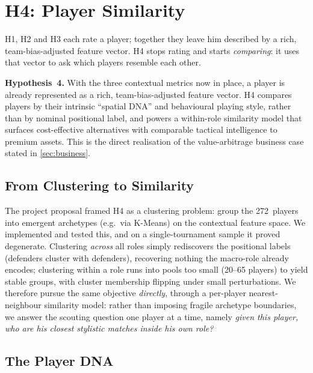 \documentclass[12pt,a4paper]{article}
\begin{document}
\clearpage
\section{H4: Player Similarity}\label{sec:h4}

H1, H2 and H3 each rate a player; together they leave him described by a rich, team-bias-adjusted feature vector. H4 stops rating and starts \emph{comparing}: it uses that vector to ask which players resemble each other.

\textbf{Hypothesis~4.}
With the three contextual metrics now in place, a player is already represented as a rich, team-bias-adjusted feature vector.
H4 compares players by their intrinsic ``spatial DNA'' and behavioural playing style, rather than by nominal positional label, and powers a within-role similarity model that surfaces cost-effective alternatives with comparable tactical intelligence to premium assets.
This is the direct realisation of the value-arbitrage business case stated in \cref{sec:business}.

\subsection{From Clustering to Similarity}\label{sec:h4-from-clustering}

The project proposal framed H4 as a clustering problem: group the 272~players into emergent archetypes (e.g.\ via K-Means) on the contextual feature space.
We implemented and tested this, and on a single-tournament sample it proved degenerate.
Clustering \emph{across} all roles simply rediscovers the positional labels (defenders cluster with defenders), recovering nothing the macro-role already encodes; clustering within a role runs into pools too small (20--65 players) to yield stable groups, with cluster membership flipping under small perturbations.
We therefore pursue the same objective \emph{directly}, through a per-player nearest-neighbour similarity model: rather than imposing fragile archetype boundaries, we answer the scouting question one player at a time, namely \emph{given this player, who are his closest stylistic matches inside his own role?}

\subsection{The Player DNA}\label{sec:h4-features}
\end{document}
